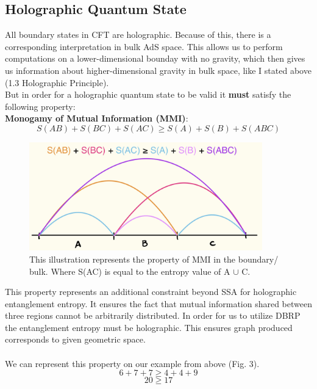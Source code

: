 \documentclass[12pt]{article}
\begin{document}
\subsection{Holographic Quantum State}
\hspace{0.5cm} All boundary states in CFT are holographic. Because of this, there is a corresponding interpretation in bulk AdS space. This allows us to perform computations on a lower-dimensional bounday with no gravity, which then gives us information about higher-dimensional gravity in bulk space, like I stated above (1.3 Holographic Principle). 
\\
But in order for a holographic quantum state to be valid it \textbf{must} satisfy the following property:
\vspace{0.3cm}
\\\textbf{Monogamy of Mutual Information (MMI)}: 
\[
S(AB) + S(BC) + S(AC) \geq S(A) + S(B) + S(ABC)
\] 
\begin{figure}[htbp]  %
    \centering
    \includegraphics[width=0.9\textwidth, height=0.25\textheight ]{mmi.jpeg}  %
    \caption{This illustration represents the property of MMI in the boundary/ bulk. Where S(AC) is equal to the entropy value of A $\cup$ C.}  %
    \label{fig:mmi}  %
\end{figure}


This property represents an additional constraint beyond SSA for holographic entanglement entropy. It ensures the fact that mutual information shared between three regions cannot be arbitrarily distributed. In order for us to utilize DBRP the entanglement entropy must be holographic. This ensures graph produced corresponds to given geometric space. 
\\
\\
We can represent this property on our example from above (Fig. 3). 
\[
6 + 7 + 7 \geq 4 + 4 + 9
\]
\[
20 \geq 17
\]
\end{document}

